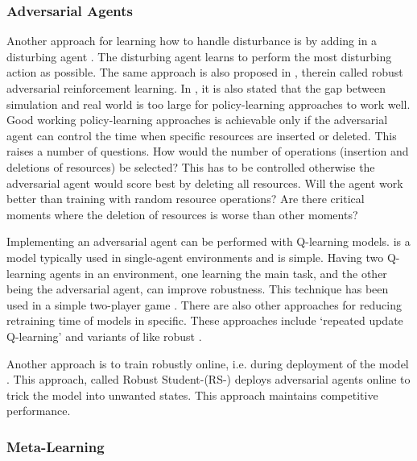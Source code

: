 \subsubsection{Adversarial Agents}\label{sec:adversarial}

Another approach for learning how to handle disturbance is by adding in a
disturbing agent \cite{morimoto2005}. The disturbing agent learns to perform
the most disturbing action as possible. The same approach is also proposed in
, therein called robust adversarial reinforcement learning.
In , it is also stated that the gap between simulation and
real world is too large for policy-learning approaches to work well. Good
working policy-learning approaches is achievable only if the adversarial agent
can control the time when specific resources are inserted or deleted. This raises
a number of questions. How would the number of operations (insertion and
deletions of resources) be selected? This has to be controlled otherwise the
adversarial agent would score best by deleting all resources. Will the agent
work better than training with random resource operations? Are there critical
moments where the deletion of resources is worse than other moments?

Implementing an adversarial agent can be performed with Q-learning models. \Ql is a
model typically used in single-agent environments and is simple. Having two
Q-learning agents in an environment, one learning the main task, and the other
being the adversarial agent, can improve robustness. This technique has been
used in a simple two-player game \cite{littman1994}. There are also other
approaches for reducing retraining time of \ql models in specific. These
approaches include `repeated update Q-learning' \cite{abdallah2016} and variants
of \dqn like robust \dqn \cite{chen2018}.

Another approach is to train robustly online, i.e. during deployment of the
model \cite{fisher2019}. This approach, called Robust Student-\dqn (RS-\dqn)
deploys adversarial agents online to trick the model into unwanted states.
This approach maintains competitive performance.


\subsubsection{Meta-Learning}\label{sec:reusing}

